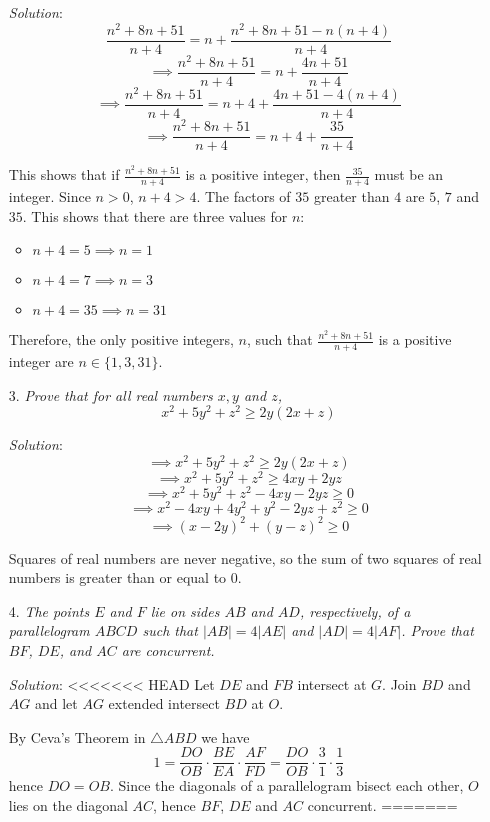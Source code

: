 \documentclass{article}
\begin{document}
\begin{enumerate}[1.]
\textit{Solution}:
$$\frac{n^2 + 8n + 51}{n + 4} = n + \frac{n^2 + 8n + 51 - n(n + 4)}{n + 4}$$
$$\implies \frac{n^2 + 8n + 51}{n + 4} = n + \frac{4n + 51}{n + 4}$$
$$\implies \frac{n^2 + 8n + 51}{n + 4} = n + 4 + \frac{4n + 51 - 4(n + 4)}{n + 4}$$
$$\implies \frac{n^2 + 8n + 51}{n + 4} = n + 4 + \frac{35}{n + 4}$$

This shows that if $\frac{n^2 + 8n + 51}{n + 4}$ is a positive integer, then $\frac{35}{n + 4}$ must be an integer. Since $n > 0$, $n + 4 > 4$.
The factors of $35$ greater than $4$ are $5$, $7$ and $35$. This shows that there are three values for $n$:
\begin{itemize}
    \item $n + 4 = 5 \implies n = 1$
    \item $n + 4 = 7 \implies n = 3$
    \item $n + 4 = 35 \implies n = 31$
\end{itemize}

Therefore, the only positive integers, $n$, such that $\frac{n^2 + 8n + 51}{n + 4}$ is a positive integer are $n \in \{1, 3, 31\}.$


\item[3.] %
\textit{Prove that for all real numbers $x, y$ and $z$,
$$x^2 + 5y^2 + z^2 \ge 2y(2x + z)$$}

\textit{Solution}:
$$\implies x^2 + 5y^2 + z^2 \ge 2y(2x + z)$$
$$\implies x^2 + 5y^2 + z^2 \ge 4xy + 2yz$$
$$\implies x^2 + 5y^2 + z^2 - 4xy - 2yz \ge 0$$
$$\implies x^2 - 4xy + 4y^2 + y^2 - 2yz + z^2 \ge 0$$
$$\implies (x - 2y)^2 + (y - z)^2 \ge 0$$

Squares of real numbers are never negative, so the sum of two squares of real numbers is greater than or equal to 0.



\item[4.] %
\textit{The points $E$ and $F$ lie on sides $AB$ and $AD$, respectively, of a parallelogram $ABCD$ such that $|AB| = 4|AE|$ and $|AD| = 4|AF|$.
Prove that $BF$, $DE$, and $AC$ are concurrent.}

\textit{Solution}:
<<<<<<< HEAD
Let $DE$ and $FB$ intersect at $G$. Join $BD$ and $AG$ and let $AG$ extended intersect $BD$ at $O$.

By Ceva's Theorem in $\triangle ABD$ we have
$$1 = \frac{DO}{OB} \cdot \frac{BE}{EA} \cdot \frac{AF}{FD} = \frac{DO}{OB} \cdot \frac{3}{1} \cdot \frac{1}{3}$$
hence $DO = OB$. Since the diagonals of a parallelogram bisect each other, $O$ lies on the diagonal $AC$, hence $BF$, $DE$ and $AC$ concurrent.
\vspace{6.81mm}
=======


\end{enumerate}
\end{document}
